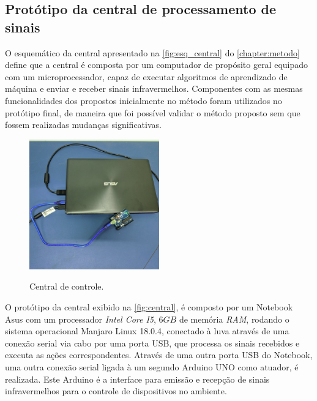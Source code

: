 \subsection{Protótipo da central de processamento de sinais}
\label{sec:prototipo}
O esquemático da central apresentado na \autoref{fig:esq_central} do \autoref{chapter:metodo} define que a central é composta por um computador de propósito geral equipado com um microprocessador, capaz de executar algoritmos de aprendizado de máquina e enviar e receber sinais infravermelhos. Componentes com as mesmas funcionalidades dos propostos inicialmente no método foram utilizados no protótipo final, de maneira que foi possível validar o método proposto sem que fossem realizadas mudanças significativas.

\begin{figure}[ht]
    \centering
    \caption{Central de controle.}
    \includegraphics[width=0.5\textwidth, keepaspectratio]{resources/central.jpg}
    \label{fig:central}
\end{figure}

O protótipo da central exibido na \autoref{fig:central}, é composto por um Notebook Asus com um processador \textit{Intel Core I5}, $6GB$ de memória \textit{RAM}, rodando o sistema operacional Manjaro Linux 18.0.4, conectado à luva através de uma conexão serial via cabo por uma porta USB, que processa os sinais recebidos e executa as ações correspondentes. Através de uma outra porta USB do Notebook, uma outra conexão serial ligada à um segundo Arduino UNO como atuador, é realizada. Este Arduino é a interface para emissão e recepção de sinais infravermelhos para o controle de dispositivos no ambiente. 



